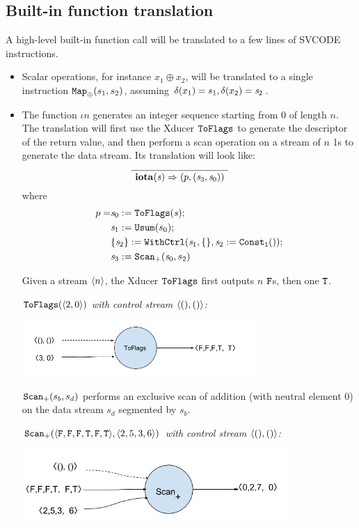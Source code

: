 \subsection{Built-in function translation}
A high-level built-in function call will be translated to a few lines of SVCODE instructions.

\begin{itemize}
	\item Scalar operations, for instance $x_1 \oplus x_2$, will be translated to a single instruction $\map{\oplus}(s_1,s_2)$, assuming $\del(x_1) = s_1, \del(x_2) = \s_2$.
	
	\item The function $\iota{n}$  generates an integer sequence starting from 0 of length $n$.  
	The translation will first use the Xducer $\toflag$ to generate the descriptor of the return value, and then perform a scan operation on a stream of $n$ 1s to generate the data stream.
	Its translation will look like: 
	$$	\PT{
		\Axiom{\Transf{\iotan}{\s}{}{}{\sfun{p} {(\s_3,\s_0)}}}
	}$$
	where 
	\begin{align*}
			p= & \sdef{\s_0}{\toflag(\s)} ; \\ 
			& \sdef{\s_1}{\usum(s_0)} ; \\
			& \withctrl{\s_1}{\sdef{\s_2}{\consta{1}()}}{\{\}}{\{\s_2\}}; \\
			& \sdef{\s_3}{\genscan_{+}(\s_0,s_2)}
		\end{align*}

Given a stream $\singl{n}$, the Xducer $\toflag$ first outputs $n$ $\F$s, then one $\T$.

\begin{example} \emph{$\toflagf{\<2,0\'>}$  with control stream $\<(),()\'>$:}\\
	\begin{center}
		\includegraphics[width=0.7\textwidth]{fig/toflagsxducer.png}
	\end{center}
\end{example}

$\genscan_{+}(s_b,s_d)$ performs an exclusive scan of addition (with neutral element 0) on the data stream $s_d$ segmented by $s_b$.
\begin{example} \emph{$\genscan_{+}(\<\F,\F,\F,\T,\F,\T\'>, \< 2,5,3,6 \'>)$  with control stream $\<(),()\'>$: }\\
	\begin{center}
		\includegraphics[width=0.8\textwidth]{fig/scanxducer.png}
	\end{center}
\end{example}




\end{itemize}

